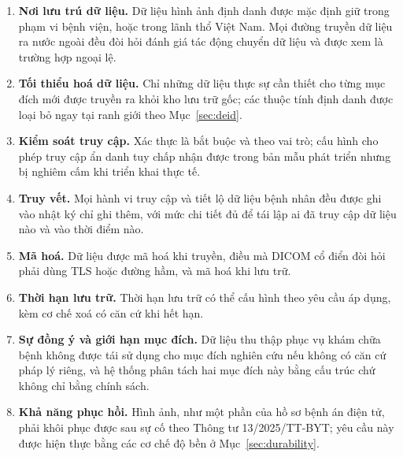 \begin{enumerate}[label=L\arabic*.,leftmargin=1.2cm]
    \item \textbf{Nơi lưu trú dữ liệu.} Dữ liệu hình ảnh định danh được mặc
          định giữ trong phạm vi bệnh viện, hoặc trong lãnh thổ Việt Nam. Mọi
          đường truyền dữ liệu ra nước ngoài đều đòi hỏi đánh giá tác động
          chuyển dữ liệu và được xem là trường hợp ngoại lệ.
    \item \textbf{Tối thiểu hoá dữ liệu.} Chỉ những dữ liệu thực sự cần thiết
          cho từng mục đích mới được truyền ra khỏi kho lưu trữ gốc; các thuộc
          tính định danh được loại bỏ ngay tại ranh giới theo Mục~\ref{sec:deid}.
    \item \textbf{Kiểm soát truy cập.} Xác thực là bắt buộc và theo vai trò;
          cấu hình cho phép truy cập ẩn danh tuy chấp nhận được trong bản mẫu
          phát triển nhưng bị nghiêm cấm khi triển khai thực tế.
    \item \textbf{Truy vết.} Mọi hành vi truy cập và tiết lộ dữ liệu bệnh nhân
          đều được ghi vào nhật ký chỉ ghi thêm, với mức chi tiết đủ để tái lập
          ai đã truy cập dữ liệu nào và vào thời điểm nào.
    \item \textbf{Mã hoá.} Dữ liệu được mã hoá khi truyền, điều mà DICOM cổ
          điển đòi hỏi phải dùng TLS hoặc đường hầm, và mã hoá khi lưu trữ.
    \item \textbf{Thời hạn lưu trữ.} Thời hạn lưu trữ có thể cấu hình theo yêu
          cầu áp dụng, kèm cơ chế xoá có căn cứ khi hết hạn.
    \item \textbf{Sự đồng ý và giới hạn mục đích.} Dữ liệu thu thập phục vụ
          khám chữa bệnh không được tái sử dụng cho mục đích nghiên cứu nếu
          không có căn cứ pháp lý riêng, và hệ thống phân tách hai mục đích này
          bằng cấu trúc chứ không chỉ bằng chính sách.
\item \textbf{Khả năng phục hồi.} Hình ảnh, như một phần của hồ sơ bệnh án
      điện tử, phải khôi phục được sau sự cố theo Thông tư 13/2025/TT-BYT;
      yêu cầu này được hiện thực bằng các cơ chế độ bền ở
      Mục~\ref{sec:durability}.
\end{enumerate}

\medskip